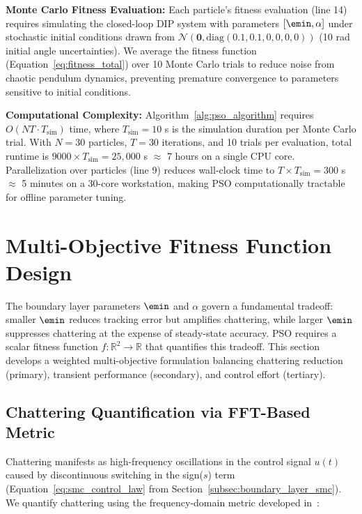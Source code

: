 \textbf{Monte Carlo Fitness Evaluation:} Each particle's fitness evaluation (line 14) requires simulating the closed-loop DIP system with parameters $[\emin, \alpha]$ under stochastic initial conditions drawn from $\mathcal{N}(\mathbf{0}, \text{diag}(0.1, 0.1, 0, 0, 0, 0))$ (10 rad initial angle uncertainties). We average the fitness function (Equation~\ref{eq:fitness_total}) over 10 Monte Carlo trials to reduce noise from chaotic pendulum dynamics, preventing premature convergence to parameters sensitive to initial conditions.

\textbf{Computational Complexity:} Algorithm~\ref{alg:pso_algorithm} requires $O(NT \cdot T_{\text{sim}})$ time, where $T_{\text{sim}} = 10$ s is the simulation duration per Monte Carlo trial. With $N=30$ particles, $T=30$ iterations, and 10 trials per evaluation, total runtime is $9000 \times T_{\text{sim}} = 25,000$ s $\approx$ 7 hours on a single CPU core. Parallelization over particles (line 9) reduces wall-clock time to $T \times T_{\text{sim}} = 300$ s $\approx$ 5 minutes on a 30-core workstation, making PSO computationally tractable for offline parameter tuning.

\section{Multi-Objective Fitness Function Design}
\label{sec:fitness_function}

The boundary layer parameters $\emin$ and $\alpha$ govern a fundamental tradeoff: smaller $\emin$ reduces tracking error but amplifies chattering, while larger $\emin$ suppresses chattering at the expense of steady-state accuracy. PSO requires a scalar fitness function $f: \mathbb{R}^2 \to \mathbb{R}$ that quantifies this tradeoff. This section develops a weighted multi-objective formulation balancing chattering reduction (primary), transient performance (secondary), and control effort (tertiary).

\subsection{Chattering Quantification via FFT-Based Metric}
\label{subsec:chattering_metric}

Chattering manifests as high-frequency oscillations in the control signal $u(t)$ caused by discontinuous switching in the sign($s$) term (Equation~\ref{eq:smc_control_law} from Section~\ref{subsec:boundary_layer_smc}). We quantify chattering using the frequency-domain metric developed in~\cite{levant2007principles}:

